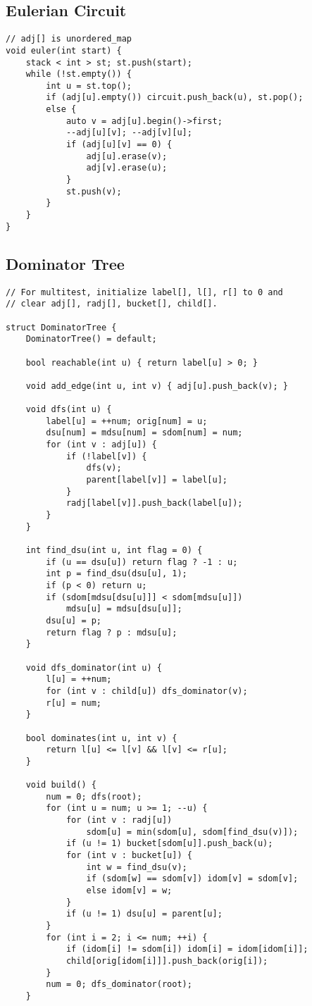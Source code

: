 \documentclass[10pt,landscape]{article}
\begin{document}
\begin{multicols}{2}
\subsection{Eulerian Circuit}
\begin{lstlisting}
// adj[] is unordered_map
void euler(int start) {
    stack < int > st; st.push(start);
    while (!st.empty()) {
        int u = st.top();
        if (adj[u].empty()) circuit.push_back(u), st.pop();
        else {
            auto v = adj[u].begin()->first;
            --adj[u][v]; --adj[v][u];
            if (adj[u][v] == 0) {
                adj[u].erase(v);
                adj[v].erase(u);
            }
            st.push(v);
        }
    }
}
\end{lstlisting}
\subsection{Dominator Tree}
\begin{lstlisting}
// For multitest, initialize label[], l[], r[] to 0 and
// clear adj[], radj[], bucket[], child[].

struct DominatorTree {
    DominatorTree() = default;

    bool reachable(int u) { return label[u] > 0; }

    void add_edge(int u, int v) { adj[u].push_back(v); }

    void dfs(int u) {
        label[u] = ++num; orig[num] = u;
        dsu[num] = mdsu[num] = sdom[num] = num;
        for (int v : adj[u]) {
            if (!label[v]) {
                dfs(v);
                parent[label[v]] = label[u];
            }
            radj[label[v]].push_back(label[u]);
        }
    }
     
    int find_dsu(int u, int flag = 0) {
        if (u == dsu[u]) return flag ? -1 : u;
        int p = find_dsu(dsu[u], 1);
        if (p < 0) return u;
        if (sdom[mdsu[dsu[u]]] < sdom[mdsu[u]])
            mdsu[u] = mdsu[dsu[u]];
        dsu[u] = p;
        return flag ? p : mdsu[u];
    }

    void dfs_dominator(int u) {
        l[u] = ++num;
        for (int v : child[u]) dfs_dominator(v);
        r[u] = num;
    }

    bool dominates(int u, int v) {
        return l[u] <= l[v] && l[v] <= r[u];
    }
    
    void build() {
        num = 0; dfs(root);
        for (int u = num; u >= 1; --u) {
            for (int v : radj[u])
                sdom[u] = min(sdom[u], sdom[find_dsu(v)]);
            if (u != 1) bucket[sdom[u]].push_back(u);
            for (int v : bucket[u]) {
                int w = find_dsu(v);
                if (sdom[w] == sdom[v]) idom[v] = sdom[v];
                else idom[v] = w;
            }
            if (u != 1) dsu[u] = parent[u];
        }
        for (int i = 2; i <= num; ++i) {
            if (idom[i] != sdom[i]) idom[i] = idom[idom[i]];
            child[orig[idom[i]]].push_back(orig[i]);
        }
        num = 0; dfs_dominator(root);
    }
    

\end{lstlisting}
\end{multicols}
\end{document}
